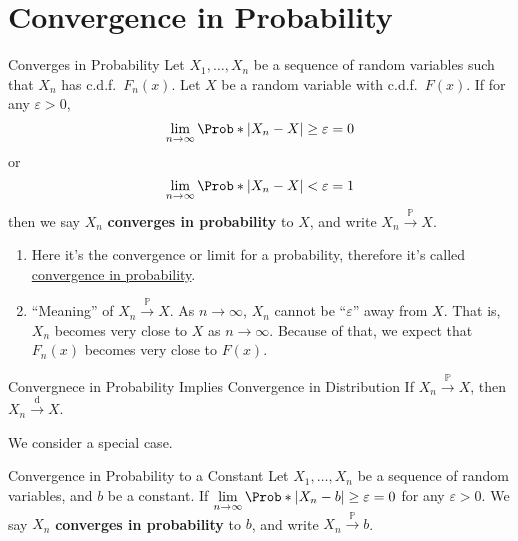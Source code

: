 \section{Convergence in Probability}
\begin{Definition}{Converges in Probability}{}
    Let $ X_1,\ldots,X_n $ be a sequence of random
    variables such that $ X_n $ has
    c.d.f.\ $ F_n(x) $. Let $ X $ be a random variable
    with c.d.f.\ $ F(x) $. If for any $ \varepsilon>0 $,
    \[ \lim\limits_{{n} \to {\infty}}
        \Prob*{\abs*{X_n-X}\ge \varepsilon}=0 \]
    or
    \[ \lim\limits_{{n} \to {\infty}}
        \Prob*{\abs*{X_n-X}<\varepsilon}=1 \]
    then we say $ X_n $ \textbf{converges in probability}
    to $ X $, and write $ X_n\stackrel{\mathbb{P}}{\to}X $.
\end{Definition}
\begin{Remark}{}{}
    \begin{enumerate}[label=(\roman*)]
        \item Here it's the convergence or limit for
              a probability, therefore it's called
              \underline{convergence in probability}.
        \item ``Meaning'' of $ X_n\stackrel{\mathbb{P}}{\to}X $.
              As $ n\to\infty $, $ X_n $ cannot be ``$ \varepsilon $''
              away from $ X $. That is, $ X_n $ becomes very
              close to $ X $ as $ n\to\infty $. Because of that,
              we expect that $ F_n(x) $ becomes very close to $ F(x) $.
    \end{enumerate}
\end{Remark}
\begin{Theorem}{Convergnece in Probability Implies Convergence in Distribution}{}
    If $ X_n\stackrel{\mathbb{P}}{\to}X $, then $ X_n\stackrel{\text{d}}{\to} X $.
\end{Theorem}
We consider a special case.
\begin{Definition}{Convergence in Probability to a Constant}{}
    Let $ X_1,\ldots,X_n $ be a sequence of random variables,
    and $ b $ be a constant. If $ \lim\limits_{{n} \to {\infty}}
        \Prob*{\abs*{X_n-b}\ge \varepsilon}=0 $
    for any $ \varepsilon>0 $. We say $ X_n $ \textbf{converges
        in probability} to $ b $, and write $ X_n\stackrel{\mathbb{P}}{\to}b $.
\end{Definition}
